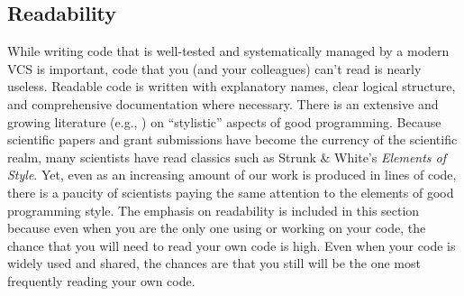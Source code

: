 \documentclass[ChapterTOCs,krantz2]{krantz} %
\begin{document}
%
%
%
%
%
%
%
%

\subsection{\label{subsec:readability}Readability}

While writing code that is well-tested and systematically managed by a modern
VCS is important, code that you (and your colleagues) can't read is nearly
useless. Readable code is written with explanatory names, clear logical
structure, and comprehensive documentation where necessary.  There is an
extensive and growing literature (e.g., \cite{boswell2011art, Fow00,
kernighan1999practice, HT00, mcconnell2009code}) on ``stylistic'' aspects of
good programming. Because scientific papers and grant submissions have become
the currency of the scientific realm, many scientists have read classics such
as Strunk \& White's \emph{Elements of Style}. Yet, even as an increasing
amount of our work is produced in lines of code, there is a paucity of
scientists paying the same attention to the elements of good programming style.
The emphasis on readability is included in this section because even when you
are the only one using or working on your code, the chance that you will need
to read your own code is high. Even when your code is widely used and shared,
the chances are that you still will be the one most frequently reading your own
code.
\end{document}

